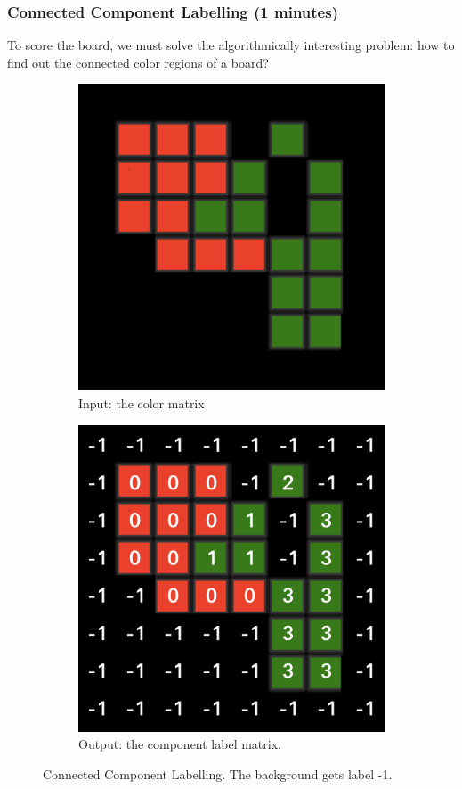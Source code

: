 \documentclass{beamer}
\begin{document}
\begin{frame}
\frametitle{Connected Component Labelling (1 minutes)}
To score the board, we must solve the algorithmically interesting problem: how to find out the connected color regions of a board?

\begin{figure}[h!]
\centering
\begin{subfigure}[t]{.5\textwidth}
  \centering
  \includegraphics[width=.7\linewidth]{before_ccl}
  \caption{Input: the color matrix}
\end{subfigure}%
\begin{subfigure}[t]{.5\textwidth}
  \centering
  \includegraphics[width=.7\linewidth]{after_ccl}
  \caption{Output: the component label matrix.}
\end{subfigure}
\caption{Connected Component Labelling. The background gets label -1.}
\end{figure}

\end{frame}
\end{document}
